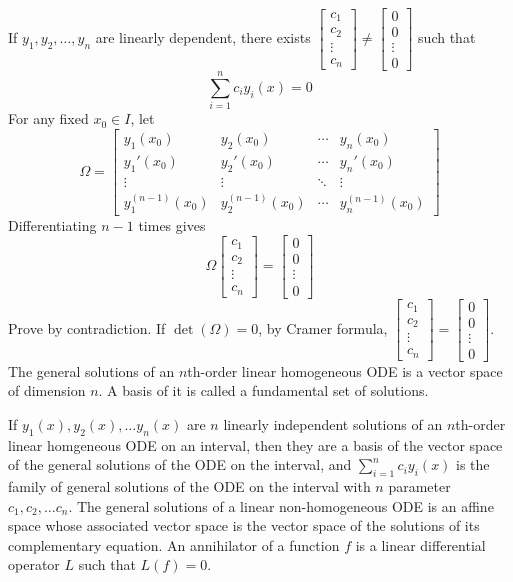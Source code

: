 \documentclass[a4paper,12pt]{report}
\begin{document}
If $y_1,y_2,\ldots,y_n$ are linearly dependent, there exists $\begin{bmatrix}c_1\\c_2\\\vdots\\c_n\end{bmatrix}\ne\begin{bmatrix}0\\0\\\vdots\\0\end{bmatrix}$ such that
\[\sum_{i=1}^nc_iy_i(x)=0\]
For any fixed $x_0\in I$, let
\[\Omega=\begin{bmatrix}
y_1(x_0) & y_2(x_0) & \cdots & y_n(x_0) \\
y_1'(x_0) & y_2'(x_0) & \cdots & y_n'(x_0) \\
\vdots & \vdots & \ddots & \vdots \\
y_1^{(n-1)}(x_0) & y_2^{(n-1)}(x_0) & \cdots & y_n^{(n-1)}(x_0)
\end{bmatrix}\]
Differentiating $n-1$ times gives
\[\Omega\begin{bmatrix}c_1\\c_2\\\vdots\\c_n\end{bmatrix}=\begin{bmatrix}0\\0\\\vdots\\0\end{bmatrix}\]
Prove by contradiction. If $\det(\Omega)=0$, by Cramer formula, $\begin{bmatrix}c_1\\c_2\\\vdots\\c_n\end{bmatrix}=\begin{bmatrix}0\\0\\\vdots\\0\end{bmatrix}$.
\epr
{}
The general solutions of an $n$th-order linear homogeneous ODE is a vector space of dimension $n$. A basis of it is called a fundamental set of solutions.

If $y_1(x),y_2(x),\ldots y_n(x)$ are $n$ linearly independent solutions of an $n$th-order linear homgeneous ODE on an interval, then they are a basis of the vector space of the general solutions of the ODE on the interval, and $\sum_{i=1}^nc_iy_i(x)$ is the family of general solutions of the ODE on the interval with $n$ parameter $c_1,c_2,\ldots c_n$.
The general solutions of a linear non-homogeneous ODE is an affine space whose associated vector space is the vector space of the solutions of its complementary equation.
An annihilator of a function $f$ is a linear differential operator $L$ such that $L(f)=0$.
\end{document}

